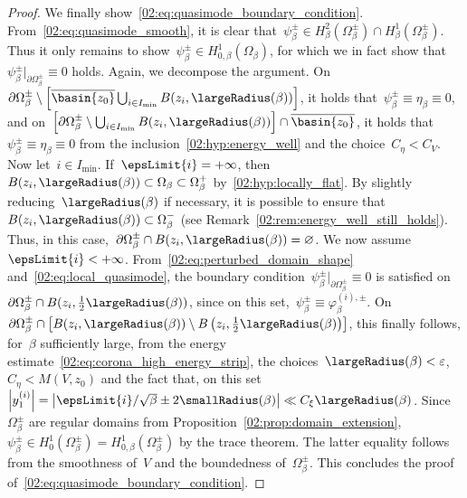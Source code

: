 \begin{proof}
                We finally show~\eqref{02:eq:quasimode_boundary_condition}. From~\eqref{02:eq:quasimode_smooth}, it is clear that~$\psi_\beta^\pm \in H^2_\beta(\Omega_\beta^\pm) \cap H^1_\beta(\Omega_\beta^\pm)$. Thus it only remains to show~$\psi_\beta^\pm \in H_{0,\beta}^1(\Omega_\beta)$, for which we in fact show that~$\psi_\beta^{\pm}|_{\partial \Omega_\beta^\pm}\equiv 0$ holds. Again, we decompose the argument.
                On~$\partial\Omega_\beta^{\pm}\setminus \left[\overline{\basin{z_0}}\bigcup_{i\in I_{\min}} B(z_i,\largeRadius(\beta))\right]$, it holds that~$\psi_\beta^\pm\equiv \eta_\beta \equiv 0$, and on~$\left[\partial\Omega_\beta^\pm \setminus \bigcup_{i\in I_{\min}}B(z_i,\largeRadius(\beta)) \right]\cap \overline{\basin{z_0}}$, it holds that~$\psi_\beta^\pm\equiv \eta_\beta\equiv 0$ from the inclusion~\eqref{02:hyp:energy_well} and the choice~$C_\eta<C_V$.
                Now let~$i\in I_{\min}$. If~$\epsLimit{i}=+\infty$, then~$B(z_i,\largeRadius(\beta)) \subset \Omega_\beta \subset\Omega_\beta^+$ by~\eqref{02:hyp:locally_flat}. By slightly reducing~$\largeRadius(\beta)$ if necessary, it is possible to ensure that~$B(z_i,\largeRadius(\beta))\subset\Omega_\beta^-$ (see Remark~\ref{02:rem:energy_well_still_holds}). Thus, in this case,~$\partial\Omega_\beta^\pm \cap B(z_i,\largeRadius(\beta)) = \varnothing$.
                We now assume~$\epsLimit{i}<+\infty$. From~\eqref{02:eq:perturbed_domain_shape} and~\eqref{02:eq:local_quasimode}, the boundary condition~$\psi_\beta^{\pm}|_{\partial \Omega_\beta^\pm}\equiv 0$ is satisfied on~$\partial\Omega_\beta^{\pm}\cap B(z_i,\frac12\largeRadius(\beta))$, since on this set,~$\psi_\beta^\pm \equiv \varphi_\beta^{(i),\pm}$.
                On~$\partial\Omega_\beta^{\pm}\cap \left[B(z_i,\largeRadius(\beta))\setminus B\left(z_i,\frac12\largeRadius(\beta)\right)\right]$, this finally follows, for~$\beta$ sufficiently large, from the energy estimate~\eqref{02:eq:corona_high_energy_strip}, the choices~$\largeRadius(\beta)<\varepsilon$,~$C_\eta<M(V,z_0)$ and the fact that, on this set~$\left|y_1^{(i)}\right| = \left|\epsLimit{i}/\sqrt\beta \pm 2\smallRadius(\beta)\right| \ll C_\xi\largeRadius(\beta)$.
                Since~$\Omega_\beta^\pm$ are regular domains from Proposition~\ref{02:prop:domain_extension},~$\psi_\beta^\pm \in H_{0}^1(\Omega_\beta^\pm) = H_{0,\beta}^1(\Omega_\beta^\pm)$ by the trace theorem. The latter equality follows from the smoothness of~$V$ and the boundedness of~$\Omega_\beta^\pm$. This concludes the proof of~\eqref{02:eq:quasimode_boundary_condition}.
                \end{proof}
